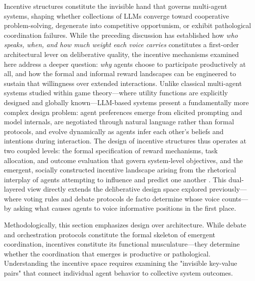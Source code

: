 \documentclass[11pt,a4paper]{article}
\begin{document}
Incentive structures constitute the invisible hand that governs multi-agent systems, shaping whether collections of LLMs converge toward cooperative problem-solving, degenerate into competitive opportunism, or exhibit pathological coordination failures. While the preceding discussion has established how \emph{who speaks, when, and how much weight each voice carries} constitutes a first-order architectural lever on deliberative quality, the incentive mechanisms examined here address a deeper question: \emph{why} agents choose to participate productively at all, and how the formal and informal reward landscapes can be engineered to sustain that willingness over extended interactions. Unlike classical multi-agent systems studied within game theory---where utility functions are explicitly designed and globally known---LLM-based systems present a fundamentally more complex design problem: agent preferences emerge from elicited prompting and model internals, are negotiated through natural language rather than formal protocols, and evolve dynamically as agents infer each other's beliefs and intentions during interaction. The design of incentive structures thus operates at two coupled levels: the formal specification of reward mechanisms, task allocation, and outcome evaluation that govern system-level objectives, and the emergent, socially constructed incentive landscape arising from the rhetorical interplay of agents attempting to influence and predict one another \cite{arxiv:2502.12110v11}. This dual-layered view directly extends the deliberative design space explored previously---where voting rules and debate protocols de facto determine whose voice counts---by asking what causes agents to voice informative positions in the first place.

Methodologically, this section emphasizes design over architecture. While debate and orchestration protocols constitute the formal skeleton of emergent coordination, incentives constitute its functional musculature---they determine whether the coordination that emerges is productive or pathological. Understanding the incentive space requires examining the "invisible key-value pairs" that connect individual agent behavior to collective system outcomes.
\end{document}
